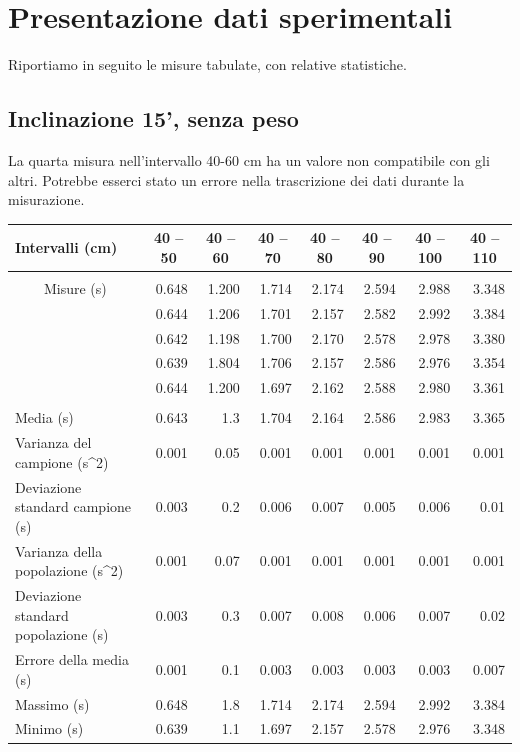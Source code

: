 \documentclass[12pt]{article} %
\begin{document}
\newpage
\section{Presentazione dati sperimentali}	
	Riportiamo in seguito le misure tabulate, con relative statistiche.
	\subsection {Inclinazione 15', senza peso}
		La quarta misura nell'intervallo 40-60 cm ha un valore non compatibile con gli altri. Potrebbe esserci stato un errore nella 			trascrizione dei dati durante la misurazione. 
		\begin{table}[H]
			\begin{tabular}{|l|r|r|r|r|r|r|r|}
			\hline
			Intervalli (cm) & \multicolumn{1}{c|}{40 – 50} & \multicolumn{1}{c|}{40 – 60} & \multicolumn{1}{c|}{40 – 70} & \multicolumn{1}{c|}{40 – 80 } & \multicolumn{1}{c|}{40 – 90} & \multicolumn{1}{c|}{40 – 100} & \multicolumn{1}{c|}{40 – 110} \\ \hline
			 & \multicolumn{ 7}{l|}{} \\ \hline
			\multicolumn{ 1}{|c|}{Misure (s)} & 0.648 & 1.200 & 1.714 & 2.174 & 2.594 & 2.988 & 3.348 \\ \cline{ 2- 8}
			\multicolumn{ 1}{|l|}{} & 0.644 & 1.206 & 1.701 & 2.157 & 2.582 & 2.992 & 3.384 \\ \cline{ 2- 8}
			\multicolumn{ 1}{|l|}{} & 0.642 & 1.198 & 1.700 & 2.170 & 2.578 & 2.978 & 3.380 \\ \cline{ 2- 8}
			\multicolumn{ 1}{|l|}{} & 0.639 & 1.804 & 1.706 & 2.157 & 2.586 & 2.976 & 3.354 \\ \cline{ 2- 8}
			\multicolumn{ 1}{|l|}{} & 0.644 & 1.200 & 1.697 & 2.162 & 2.588 & 2.980 & 3.361 \\ \hline
			 & \multicolumn{ 7}{c|}{} \\ \hline
			Media (s) & 0.643 & 1.3 & 1.704 & 2.164 & 2.586 & 2.983 & 3.365 \\ \hline
			Varianza del campione (s^2) & 0.001 & 0.05 & 0.001 & 0.001 & 0.001 & 0.001 & 0.001 \\ \hline
			Deviazione standard campione (s) & 0.003 & 0.2 & 0.006 & 0.007 & 0.005 & 0.006 & 0.01 \\ \hline
			Varianza della popolazione (s^2) & 0.001 & 0.07 & 0.001 & 0.001 & 0.001 & 0.001 & 0.001 \\ \hline
			Deviazione standard popolazione (s) & 0.003 & 0.3 & 0.007 & 0.008 & 0.006 & 0.007 & 0.02 \\ \hline
			Errore della media (s) & 0.001 & 0.1 & 0.003 & 0.003 & 0.003 & 0.003 & 0.007 \\ \hline
			Massimo (s) & 0.648 & 1.8 & 1.714 & 2.174 & 2.594 & 2.992 & 3.384 \\ \hline
			Minimo (s) & 0.639 & 1.1 & 1.697 & 2.157 & 2.578 & 2.976 & 3.348 \\ \hline
			\end{tabular}
		\label{15n}
		\end{table}
\end{document}
